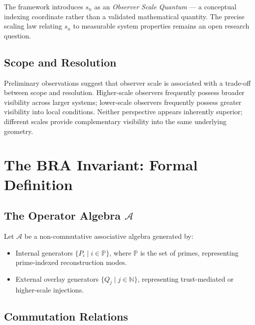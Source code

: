 \documentclass[12pt]{article}
\theoremstyle{plain}
\theoremstyle{definition}
\theoremstyle{remark}
\begin{document}
The framework introduces $s_n$ as an \emph{Observer Scale Quantum} — a conceptual indexing coordinate rather than a validated mathematical quantity. The precise scaling law relating $s_n$ to measurable system properties remains an open research question.

\subsection{Scope and Resolution}

Preliminary observations suggest that observer scale is associated with a trade-off between scope and resolution. Higher-scale observers frequently possess broader visibility across larger systems; lower-scale observers frequently possess greater visibility into local conditions. Neither perspective appears inherently superior; different scales provide complementary visibility into the same underlying geometry.

\section{The BRA Invariant: Formal Definition}


\subsection{The Operator Algebra $\mathcal{A}$}

Let $\mathcal{A}$ be a non-commutative associative algebra generated by:
\begin{itemize}
    \item Internal generators $\{P_i \mid i \in \mathbb{P}\}$, where $\mathbb{P}$ is the set of primes, representing prime-indexed reconstruction modes.
    \item External overlay generators $\{Q_j \mid j \in \mathbb{N}\}$, representing trust-mediated or higher-scale injections.
\end{itemize}


\subsection{Commutation Relations}
\end{document}
